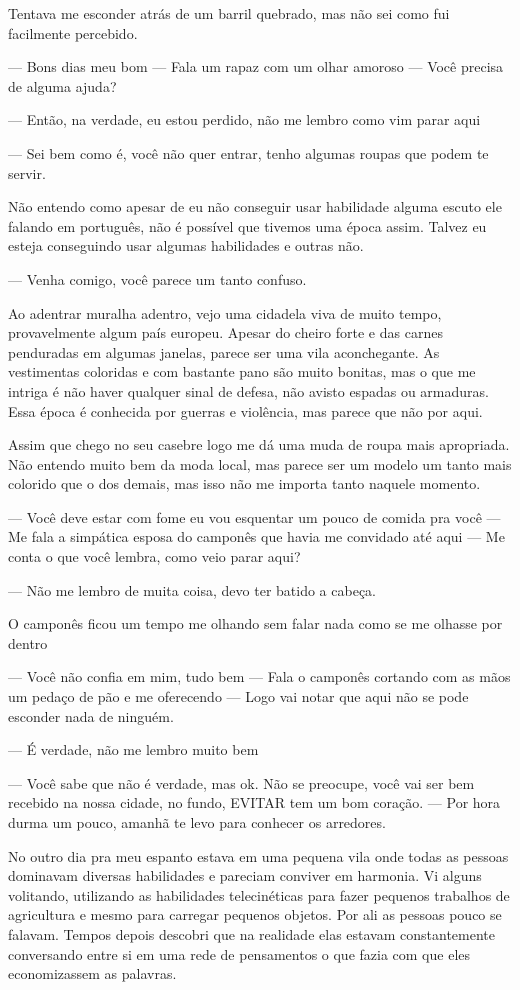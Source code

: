 Tentava me esconder atrás de um barril quebrado, mas não sei como fui facilmente percebido.

— Bons dias meu bom — Fala um rapaz com um olhar amoroso — Você precisa de alguma ajuda?

— Então, na verdade, eu estou perdido, não me lembro como vim parar aqui

— Sei bem como é, você não quer entrar, tenho algumas roupas que podem te servir.

Não entendo como apesar de eu não conseguir usar habilidade alguma escuto ele falando em português, não é possível que tivemos uma época assim. Talvez eu esteja conseguindo usar algumas habilidades e outras não.

— Venha comigo, você parece um tanto confuso.

Ao adentrar muralha adentro, vejo uma cidadela viva de muito tempo, provavelmente algum país europeu. Apesar do cheiro forte e das carnes penduradas em algumas janelas, parece ser uma vila aconchegante. As vestimentas coloridas e com bastante pano são muito bonitas, mas o que me intriga é não haver qualquer sinal de defesa, não avisto espadas ou armaduras. Essa época é conhecida por guerras e violência, mas parece que não por aqui.

Assim que chego no seu casebre logo me dá uma muda de roupa mais apropriada. Não entendo muito bem da moda local, mas parece ser um modelo um tanto mais colorido que o dos demais, mas isso não me importa tanto naquele momento.

— Você deve estar com fome eu vou esquentar um pouco de comida pra você — Me fala a simpática esposa do camponês que havia me convidado até aqui
— Me conta o que você lembra, como veio parar aqui?

— Não me lembro de muita coisa, devo ter batido a cabeça.

O camponês ficou um tempo me olhando sem falar nada como se me olhasse por dentro

— Você não confia em mim, tudo bem — Fala o camponês cortando com as mãos um pedaço de pão e me oferecendo — Logo vai notar que aqui não se pode esconder nada de ninguém.

— É verdade, não me lembro muito bem

— Você sabe que não é verdade, mas ok. Não se preocupe, você vai ser bem recebido na nossa cidade, no fundo, EVITAR tem um bom coração. — Por hora durma um pouco, amanhã te levo para conhecer os arredores.

No outro dia pra meu espanto estava em uma pequena vila onde todas as pessoas dominavam diversas habilidades e pareciam conviver em harmonia. Vi alguns volitando, utilizando as habilidades telecinéticas para fazer pequenos trabalhos de agricultura e mesmo para carregar pequenos objetos. Por ali as pessoas pouco se falavam. Tempos depois descobri que na realidade elas estavam constantemente conversando entre si em uma rede de pensamentos o que fazia com que eles economizassem as palavras.


